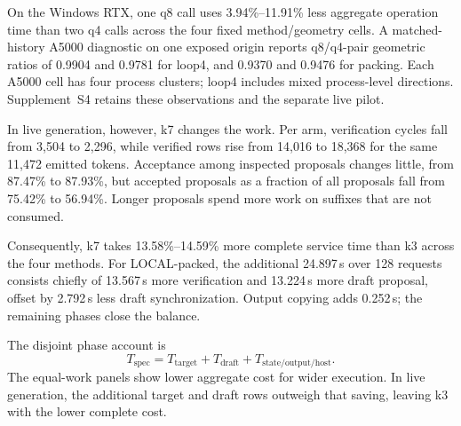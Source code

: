 On the Windows RTX, one q8 call uses 3.94\%--11.91\% less aggregate operation time than two q4 calls across the four fixed method/geometry cells. A matched-history A5000 diagnostic on one exposed origin reports q8/q4-pair geometric ratios of 0.9904 and 0.9781 for loop4, and 0.9370 and 0.9476 for packing. Each A5000 cell has four process clusters; loop4 includes mixed process-level directions. Supplement~S4 retains these observations and the separate live pilot.

In live generation, however, k7 changes the work. Per arm, verification cycles fall from 3,504 to 2,296, while verified rows rise from 14,016 to 18,368 for the same 11,472 emitted tokens. Acceptance among inspected proposals changes little, from 87.47\% to 87.93\%, but accepted proposals as a fraction of all proposals fall from 75.42\% to 56.94\%. Longer proposals spend more work on suffixes that are not consumed.

Consequently, k7 takes 13.58\%--14.59\% more complete service time than k3 across the four methods. For LOCAL-packed, the additional 24.897\,s over 128 requests consists chiefly of 13.567\,s more verification and 13.224\,s more draft proposal, offset by 2.792\,s less draft synchronization. Output copying adds 0.252\,s; the remaining phases close the balance.

The disjoint phase account is
\begin{equation}
 T_{\mathrm{spec}}=T_{\mathrm{target}}+T_{\mathrm{draft}}+T_{\mathrm{state/output/host}}.
 \label{eq:cost}
\end{equation}
The equal-work panels show lower aggregate cost for wider execution. In live generation, the additional target and draft rows outweigh that saving, leaving k3 with the lower complete cost.
